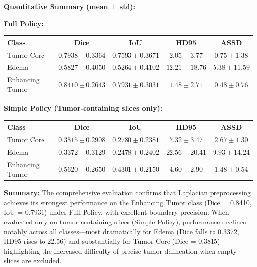 \vspace{1em}

\clearpage

\textbf{Quantitative Summary (mean ± std):}

\vspace{1em}
\noindent\textbf{Full Policy:}

\begin{center}
\begin{tabular}{lcccc}
\toprule
\textbf{Class} & \textbf{Dice} & \textbf{IoU} & \textbf{HD95} & \textbf{ASSD} \\
\midrule
Tumor Core       & $0.7938 \pm 0.3364$ & $0.7593 \pm 0.3671$ & $2.05 \pm 3.77$  & $0.75 \pm 1.38$ \\
Edema            & $0.5827 \pm 0.4050$ & $0.5264 \pm 0.4102$ & $12.21 \pm 18.76$ & $5.38 \pm 11.59$ \\
Enhancing Tumor  & $0.8410 \pm 0.2643$ & $0.7931 \pm 0.3031$ & $1.48 \pm 2.71$  & $0.48 \pm 0.76$ \\
\bottomrule
\end{tabular}
\end{center}

\vspace{1em}
\noindent\textbf{Simple Policy (Tumor-containing slices only):}

\begin{center}
\begin{tabular}{lcccc}
\toprule
\textbf{Class} & \textbf{Dice} & \textbf{IoU} & \textbf{HD95} & \textbf{ASSD} \\
\midrule
Tumor Core       & $0.3815 \pm 0.2908$ & $0.2780 \pm 0.2381$ & $7.32 \pm 3.47$  & $2.67 \pm 1.30$ \\
Edema            & $0.3372 \pm 0.3129$ & $0.2478 \pm 0.2402$ & $22.56 \pm 20.41$ & $9.93 \pm 14.24$ \\
Enhancing Tumor  & $0.5620 \pm 0.2650$ & $0.4301 \pm 0.2150$ & $4.60 \pm 2.90$  & $1.48 \pm 0.54$ \\
\bottomrule
\end{tabular}
\end{center}

\vspace{1em}

\textbf{Summary:}  
The comprehensive evaluation confirms that Laplacian preprocessing achieves its strongest performance on the Enhancing Tumor class (Dice = 0.8410, IoU = 0.7931) under Full Policy, with excellent boundary precision. When evaluated only on tumor‐containing slices (Simple Policy), performance declines notably across all classes—most dramatically for Edema (Dice falls to 0.3372, HD95 rises to 22.56) and substantially for Tumor Core (Dice = 0.3815)—highlighting the increased difficulty of precise tumor delineation when empty slices are excluded.  


